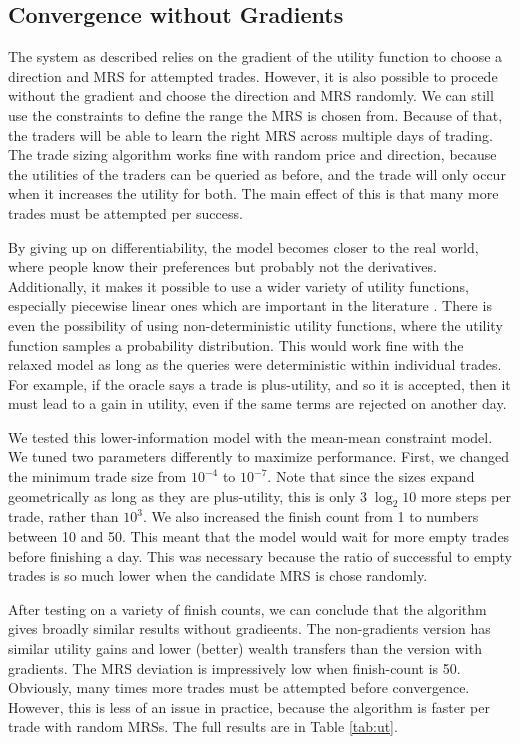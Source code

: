 \documentclass[12pt,a4paper,titlepage]{article}
\begin{document}
\subsection{Convergence without Gradients}\label{nograd}
The system as described relies on the gradient of the utility function to choose a direction and MRS for attempted trades.
However, it is also possible to procede without the gradient and choose the direction and MRS randomly.
We can still use the constraints to define the range the MRS is chosen from.
Because of that, the traders will be able to learn the right MRS across multiple days of trading.
The trade sizing algorithm works fine with random price and direction, because the utilities of the traders can be queried as before, and the trade will only occur when it increases the utility for both.
The main effect of this is that many more trades must be attempted per success.

By giving up on differentiability, the model becomes closer to the real world, where people know their preferences but probably not the derivatives.
Additionally, it makes it possible to use a wider variety of utility functions, especially piecewise linear ones which are important in the literature \cite{chen}.
There is even the possibility of using non-deterministic utility functions, where the utility function samples a probability distribution.
This would work fine with the relaxed model as long as the queries were deterministic within individual trades.
For example, if the oracle says a trade is plus-utility, and so it is accepted, then it must lead to a gain in utility, even if the same terms are rejected on another day.

We tested this lower-information model with the mean-mean constraint model.
We tuned two parameters differently to maximize performance. 
First, we changed the minimum trade size from $10^{-4}$ to $10^{-7}$.
Note that since the sizes expand geometrically as long as they are plus-utility, this is only $3 \; \log_2 10$ more steps per trade, rather than $10^3$.
We also increased the finish count from 1 to numbers between 10 and 50.
This meant that the model would wait for more empty trades before finishing a day.
This was necessary because the ratio of successful to empty trades is so much lower when the candidate MRS is chose randomly.


After testing on a variety of finish counts, we can conclude that the algorithm gives broadly similar results without gradieents. 
The non-gradients version has similar utility gains and lower (better) wealth transfers than the version with gradients.
The MRS deviation is impressively low when finish-count is 50.
Obviously, many times more trades must be attempted before convergence.
However, this is less of an issue in practice, because the algorithm is faster per trade with random MRSs.
The full results are in Table \ref{tab:ut}.
\end{document}
